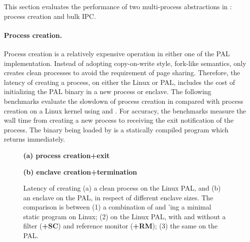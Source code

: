 \label{sec:eval:pal:multi-proc}

This section evaluates the performance of two multi-process abstractions in \thehostabi:
process creation and bulk IPC.



\paragraph{Process creation.}
Process creation is a relatively expensive
operation in
either one of the PAL implementation.
Instead of adopting copy-on-write style, fork-like semantics,
\thehostabi{} 
only creates clean processes
to avoid the requirement of page sharing.
Therefore, the latency of creating a process,
on either the Linux or \sgx{} PAL,
includes the cost of initializing the PAL binary in a new process or enclave.
The following benchmarks evaluate
the slowdown of process creation in \thehostabi{}
compared with
process creation on a Linux kernel
using  and .
For accuracy,
the benchmarks measure
the wall time from creating a new process
to receiving the exit notification of the process.
The binary being loaded by  is a statically compiled program
which returns immediately.


\begin{figure*}[t!]
\centering
\footnotesize
{}
\parbox{0.59\textwidth}{\centering\bf (a) process creation+exit}
\parbox{0.39\textwidth}{\centering\bf (b) \sgx{} enclave creation+termination}
\caption{Latency of creating (a) a clean process on the Linux PAL, and (b) an enclave on the \sgx{} PAL, in respect of different enclave sizes.
The comparison is between (1) a combination of  and 'ing a minimal static program on Linux; (2)  on the Linux PAL, with and without a \seccomp{} filter ({\bf +SC}) and reference monitor ({\bf +RM}); (3) the same \hostapi{} on the \sgx{} PAL.}
\label{fig:eval:pal:proc-latency}
\end{figure*}



